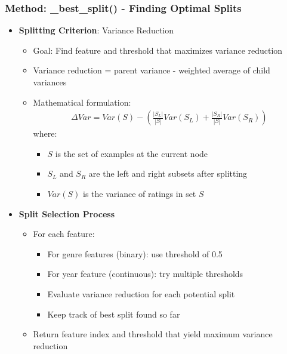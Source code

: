 \documentclass{beamer}
\begin{document}
\begin{frame}
\frametitle{Method: \_best\_split() - Finding Optimal Splits}

\begin{itemize}
    \item \textbf{Splitting Criterion}: Variance Reduction
    \begin{itemize}
        \item Goal: Find feature and threshold that maximizes variance reduction
        \item Variance reduction = parent variance - weighted average of child variances
        \item Mathematical formulation:
        \begin{align*}
        \Delta Var = Var(S) - \left(\frac{|S_L|}{|S|} Var(S_L) + \frac{|S_R|}{|S|} Var(S_R)\right)
        \end{align*}
        where:
        \begin{itemize}
            \item $S$ is the set of examples at the current node
            \item $S_L$ and $S_R$ are the left and right subsets after splitting
            \item $Var(S)$ is the variance of ratings in set $S$
        \end{itemize}
    \end{itemize}
    
    \item \textbf{Split Selection Process}
    \begin{itemize}
        \item For each feature:
        \begin{itemize}
            \item For genre features (binary): use threshold of 0.5
            \item For year feature (continuous): try multiple thresholds
            \item Evaluate variance reduction for each potential split
            \item Keep track of best split found so far
        \end{itemize}
        \item Return feature index and threshold that yield maximum variance reduction
    \end{itemize}
\end{itemize}
\end{frame}
\end{document}
